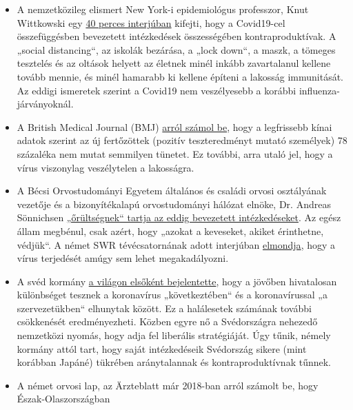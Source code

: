 \begin{itemize}
\tightlist
\item
  A nemzetközileg elismert New York-i epidemiológus professzor, Knut
  Wittkowski egy \href{https://www.youtube.com/watch?v=lGC5sGdz4kg}{40
  perces interjúban} kifejti, hogy a Covid19-cel összefüggésben
  bevezetett intézkedések összességében kontraproduktívak. A „social
  distancing``, az iskolák bezárása, a „lock down``, a maszk, a tömeges
  tesztelés és az oltások helyett az életnek minél inkább zavartalanul
  kellene tovább mennie, és minél hamarabb ki kellene építeni a lakosság
  immunitását. Az eddigi ismeretek szerint a Covid19 nem veszélyesebb a
  korábbi influenza-járványoknál.
\item
  A British Medical Journal (BMJ)
  \href{https://www.bmj.com/content/369/bmj.m1375}{arról számol be},
  hogy a legfrissebb kínai adatok szerint az új fertőzöttek (pozitív
  teszteredményt mutató személyek) 78 százaléka nem mutat semmilyen
  tünetet. Ez további, arra utaló jel, hogy a vírus viszonylag
  veszélytelen a lakosságra.
\item
  A Bécsi Orvostudományi Egyetem általános és családi orvosi osztályának
  vezetője és a bizonyítékalapú orvostudományi hálózat elnöke, Dr.
  Andreas Sönnichsen
  \href{https://www.diepresse.com/5794224/was-machen-wir-da-auf-den-intensivstationen-eigentlich}{„őrültségnek``
  tartja az eddig bevezetett intézkedéseket}. Az egész állam megbénul,
  csak azért, hogy „azokat a keveseket, akiket érinthetne, védjük``. A
  német SWR tévécsatornának adott interjúban
  \href{https://www.swr.de/swraktuell/radio/im-gespraech/corona-krise-wir-kommen-nicht-an-der-ausbreitung-vorbei-100.html}{elmondja},
  hogy a vírus terjedését amúgy sem lehet megakadályozni.
\item
  A svéd kormány
  \href{https://www.telegraph.co.uk/news/2020/04/03/coronavirus-swedish-experiment-could-prove-britain-wrong/}{a
  világon elsőként bejelentette}, hogy a jövőben hivatalosan különbséget
  tesznek a koronavírus „következtében`` és a koronavírussal „a
  szervezetükben`` elhunytak között. Ez a halálesetek számának további
  csökkenését eredményezheti. Közben egyre nő a Svédországra nehezedő
  nemzetközi nyomás, hogy adja fel liberális stratégiáját. Úgy tűnik,
  némely kormány attól tart, hogy saját intézkedéseik Svédország sikere
  (mint korábban Japáné) tükrében aránytalannak és kontraproduktívnak
  tűnnek.
\item
  A német orvosi lap, az Ärzteblatt már 2018-ban arról számolt be, hogy
  Észak-Olaszországban

\end{itemize}
